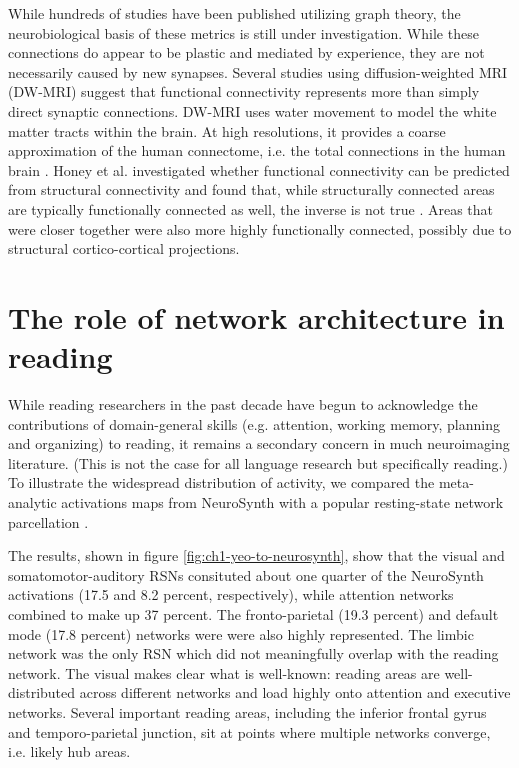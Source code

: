 While hundreds of studies have been published utilizing graph theory, the neurobiological basis of these metrics is still under investigation. While these connections do appear to be plastic and mediated by experience, they are not necessarily caused by new synapses. Several studies using diffusion-weighted MRI (DW-MRI) suggest that functional connectivity represents more than simply direct synaptic connections. DW-MRI uses water movement to model the white matter tracts within the brain. At high resolutions, it provides a coarse approximation of the human connectome, i.e. the total connections in the human brain \citep{Sporns2005}. Honey et al. investigated whether functional connectivity can be predicted from structural connectivity and found that, while structurally connected areas are typically functionally connected as well, the inverse is not true \citep{Honey2009}. Areas that were closer together were also more highly functionally connected, possibly due to structural cortico-cortical projections. 

\section{The role of network architecture in reading}
While reading researchers in the past decade have begun to acknowledge the contributions of domain-general skills (e.g. attention, working memory, planning and organizing) to reading, it remains a secondary concern in much neuroimaging literature. (This is not the case for all language research but specifically reading.) To illustrate the widespread distribution of activity, we compared the meta-analytic activations maps from NeuroSynth with a popular resting-state network parcellation \citep{Bailey2018}. 

The results, shown in figure \ref{fig:ch1-yeo-to-neurosynth}, show that the visual and somatomotor-auditory RSNs consituted about one quarter of the NeuroSynth activations (17.5 and 8.2 percent, respectively), while attention networks combined to make up 37 percent. The fronto-parietal (19.3 percent) and default mode (17.8 percent) networks were were also highly represented. The limbic network was the only RSN which did not meaningfully overlap with the reading network. The visual makes clear what is well-known: reading areas are well-distributed across different networks and load highly onto attention and executive networks. Several important reading areas, including the inferior frontal gyrus and temporo-parietal junction, sit at points where multiple networks converge, i.e. likely hub areas.

